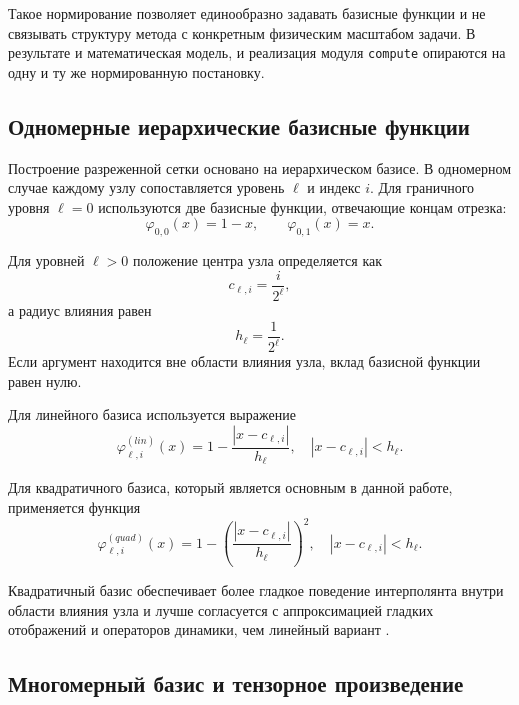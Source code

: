 Такое нормирование позволяет единообразно задавать базисные функции и не связывать структуру метода с конкретным физическим масштабом задачи. В результате и математическая модель, и реализация модуля \texttt{compute} опираются на одну и ту же нормированную постановку.

\subsection{Одномерные иерархические базисные функции}

Построение разреженной сетки основано на иерархическом базисе. В одномерном случае каждому узлу сопоставляется уровень $\ell$ и индекс $i$. Для граничного уровня $\ell = 0$ используются две базисные функции, отвечающие концам отрезка:
\begin{equation}
    \varphi_{0,0}(x) = 1 - x, \qquad \varphi_{0,1}(x) = x.
\end{equation}

Для уровней $\ell > 0$ положение центра узла определяется как
\begin{equation}
    c_{\ell,i} = \frac{i}{2^{\ell}},
\end{equation}
а радиус влияния равен
\begin{equation}
    h_{\ell} = \frac{1}{2^{\ell}}.
\end{equation}
Если аргумент находится вне области влияния узла, вклад базисной функции равен нулю.

Для линейного базиса используется выражение
\begin{equation}
    \varphi_{\ell,i}^{(lin)}(x) = 1 - \frac{|x - c_{\ell,i}|}{h_{\ell}}, \quad |x-c_{\ell,i}| < h_{\ell}.
\end{equation}

Для квадратичного базиса, который является основным в данной работе, применяется функция
\begin{equation}
    \varphi_{\ell,i}^{(quad)}(x) = 1 - \left(\frac{|x - c_{\ell,i}|}{h_{\ell}}\right)^2, \quad |x-c_{\ell,i}| < h_{\ell}.
\end{equation}

Квадратичный базис обеспечивает более гладкое поведение интерполянта внутри области влияния узла и лучше согласуется с аппроксимацией гладких отображений и операторов динамики, чем линейный вариант \cite{Quarteroni2007,Moin2010}.

\subsection{Многомерный базис и тензорное произведение}

